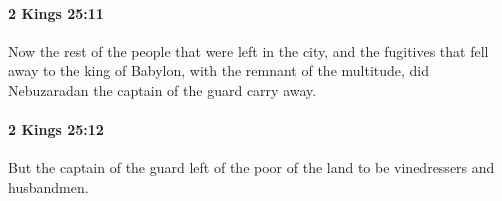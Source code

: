 		\paragraph{2 Kings 25:11} %
			\label{2KINGS-25-11}

			Now the rest of the people that were left in the city, and the fugitives that fell away to the king of Babylon, with the remnant of the multitude, did Nebuzaradan the captain of the guard carry away.


		\paragraph{2 Kings 25:12} %
			\label{2KINGS-25-12}

			But the captain of the guard left of the poor of the land to be vinedressers and husbandmen.


